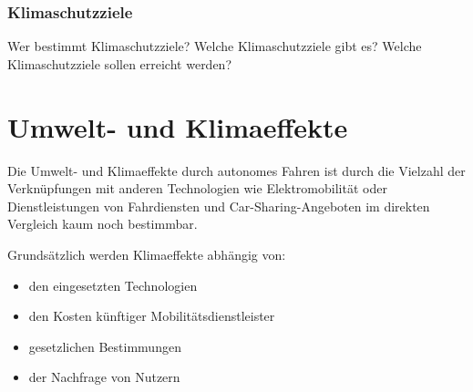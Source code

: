 











\subsection{Klimaschutzziele}
Wer bestimmt Klimaschutzziele?
Welche Klimaschutzziele gibt es?
Welche Klimaschutzziele sollen erreicht werden?



\newpage

\chapter{Umwelt- und Klimaeffekte}
Die Umwelt- und Klimaeffekte durch autonomes Fahren ist durch die Vielzahl der Verknüpfungen mit anderen Technologien wie Elektromobilität
oder Dienstleistungen von Fahrdiensten und Car-Sharing-Angeboten im direkten Vergleich kaum noch bestimmbar.

Grundsätzlich werden Klimaeffekte abhängig von:
\begin{itemize}
	\item den eingesetzten Technologien
	\item den Kosten künftiger Mobilitätsdienstleister
	\item gesetzlichen Bestimmungen
	\item der Nachfrage von Nutzern
\end{itemize}

